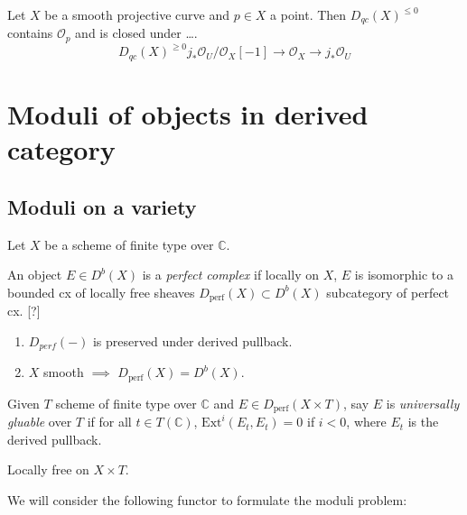 \begin{example}
\label{example-curve}
Let $X$ be a smooth projective curve and $p \in X$ a point. Then
$D_{qc}(X)^{\leq 0}$ contains $\mathcal{O}_p$ and is closed under ….
$$
D_{qc}(X)^{\geq 0}j_* \mathcal{O}_U/\mathcal{O}_X[-1] \to 
\mathcal{O}_X \to j_*\mathcal{O}_U
$$
\end{example}

\section{Moduli of objects in derived category}
\label{section-moduli-of-obejects-in-derived-category}

\subsection{Moduli on a variety}
\label{subsection-moduli-on-a-variety}

Let $X$ be a scheme of finite type over $\mathbb{C}$.

\begin{definition}
\label{definition-perfect-complex}
An object $E \in D^b(X)$ is a {\it perfect complex} if locally on $X$, $E$ is
isomorphic to a bounded cx of locally free sheaves
$D_{\text{perf}}(X)\subset D^b(X)$ subcategory of perfect cx. [?]
\end{definition}

\begin{remark}
\label{remark-perfect}
\begin{enumerate}
\item $D_{perf}(-)$ is preserved under derived pullback.
\item $X$ smooth $\implies$ $D_{\text{perf}}(X)=D^b(X)$.
\end{enumerate}
\end{remark}

\begin{definition}
\label{definition-universally-gluable}
Given $T$ scheme of finite type over $\mathbb{C}$ and $E \in
D_{\text{perf}}(X\times T)$, say $E$ is {\it universally gluable} over $T$ if
for all $t \in T(\mathbb{C})$, $\text{Ext}^i(E_t,E_t)=0$ if $i<0$, where  $E_t$
is the derived pullback.
\end{definition}

\begin{example}
\label{example-locally-free}
Locally free on $X \times T$.
\end{example}

We will consider the following functor to formulate the moduli problem:

